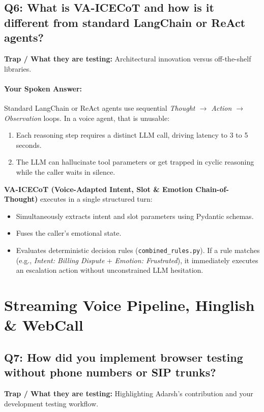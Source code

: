 \documentclass[11pt,a4paper]{article}
\begin{document}
\vspace{1em}

\subsection*{Q6: What is VA-ICECoT and how is it different from standard LangChain or ReAct agents?}
\textbf{Trap / What they are testing:} Architectural innovation versus off-the-shelf libraries.

\paragraph{Your Spoken Answer:}
Standard LangChain or ReAct agents use sequential \textit{Thought $\rightarrow$ Action $\rightarrow$ Observation} loops. In a voice agent, that is unusable:
\begin{enumerate}
    \item Each reasoning step requires a distinct LLM call, driving latency to 3 to 5 seconds.
    \item The LLM can hallucinate tool parameters or get trapped in cyclic reasoning while the caller waits in silence.
\end{enumerate}
\textbf{VA-ICECoT (Voice-Adapted Intent, Slot \& Emotion Chain-of-Thought)} executes in a single structured turn:
\begin{itemize}
    \item Simultaneously extracts intent and slot parameters using Pydantic schemas.
    \item Fuses the caller's emotional state.
    \item Evaluates deterministic decision rules (\texttt{combined\_rules.py}). If a rule matches (e.g., \textit{Intent: Billing Dispute} + \textit{Emotion: Frustrated}), it immediately executes an escalation action without unconstrained LLM hesitation.
\end{itemize}

\newpage

\section{Streaming Voice Pipeline, Hinglish \& WebCall}

\subsection*{Q7: How did you implement browser testing without phone numbers or SIP trunks?}
\textbf{Trap / What they are testing:} Highlighting Adarsh's contribution and your development testing workflow.
\end{document}
